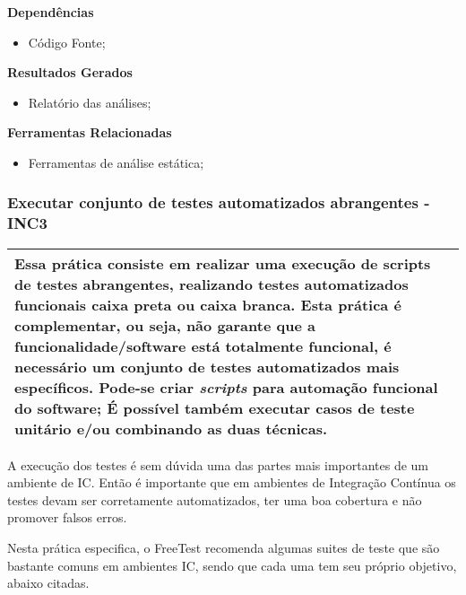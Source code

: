 \textbf{Dependências}
\begin{itemize}
    \item Código Fonte;
\end{itemize}

\textbf{ Resultados Gerados}
\begin{itemize}
    \item Relatório das análises;
\end{itemize}

\textbf{Ferramentas Relacionadas}
\begin{itemize}
    \item Ferramentas de análise estática;
\end{itemize}

\subsubsection{Executar conjunto de testes automatizados abrangentes - INC3}
\label{sec:inc3}

\begin{table}[H]
\centering
\begin{tabular}{|p{130mm}|}
\hline
Essa prática consiste em realizar uma execução de scripts de testes abrangentes, realizando testes automatizados funcionais caixa preta ou caixa branca. Esta prática é complementar, ou seja, não garante que a funcionalidade/software está totalmente funcional, é necessário um conjunto de testes automatizados mais específicos. Pode-se criar \textit{scripts} para automação funcional do software; É possível também executar casos de teste unitário e/ou combinando as duas técnicas. \\ 
\hline
\end{tabular}
\end{table}

A execução dos testes é sem dúvida uma das partes mais importantes de um ambiente de IC. Então é importante que em ambientes de Integração Contínua os testes devam ser corretamente automatizados, ter uma boa cobertura e não promover falsos erros.

Nesta prática especifica, o FreeTest recomenda algumas suites de teste que são bastante comuns em ambientes IC, sendo que cada uma tem seu próprio objetivo, abaixo citadas.

